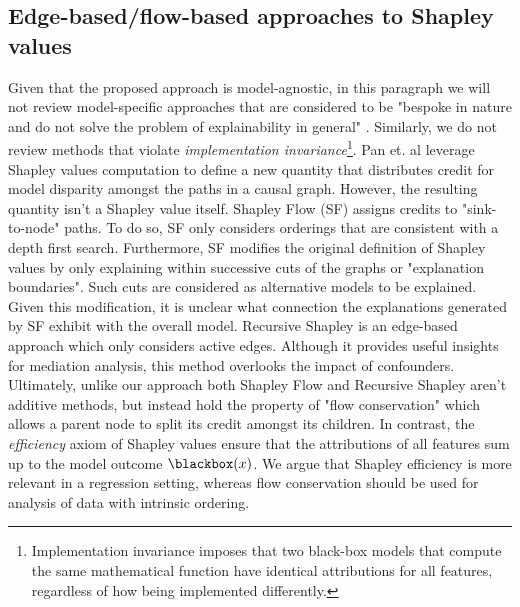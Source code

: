 \subsection{Edge-based/flow-based approaches to Shapley values} 
\label{subsec:further_graph_based}
Given that the proposed approach is model-agnostic, in this paragraph we will not review model-specific approaches that are considered to be "bespoke in nature and do not solve the problem of explainability in general" . Similarly, we do not review methods that violate \textit{implementation invariance}\footnote{Implementation invariance imposes that two black-box models that compute the same mathematical function have identical attributions for all features, regardless of how being implemented differently.}. Pan et. al  leverage Shapley values computation to define a new quantity that distributes credit for model disparity amongst the paths in a causal graph. However, the resulting quantity isn't a Shapley value itself. Shapley Flow (SF) assigns credits to "sink-to-node" paths. To do so, SF only considers orderings that are consistent with a depth first search. Furthermore, SF modifies the original definition of Shapley values by only explaining within successive cuts of the graphs or "explanation boundaries". Such cuts are considered as alternative models to be explained. Given this modification, it is unclear what connection the explanations generated by SF exhibit with the overall model. Recursive Shapley  is an edge-based approach which only considers active edges. Although it provides useful insights for mediation analysis, this method overlooks the impact of confounders. Ultimately, unlike our approach both Shapley Flow and Recursive Shapley aren't additive methods, but instead hold the property of "flow conservation" which allows a parent node to split its credit amongst its children. In contrast, the \textit{efficiency} axiom of Shapley values ensure that the attributions of all features sum up to the model outcome $\blackbox(x)$. We argue that Shapley efficiency is more relevant in a regression setting, whereas flow conservation should be used for analysis of data with intrinsic ordering. 


